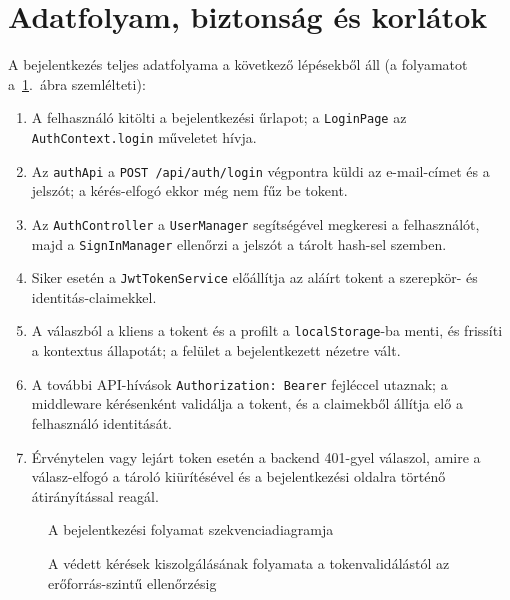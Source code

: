 \section{Adatfolyam, biztonság és korlátok}
\label{sec:users-biztonsag}

A bejelentkezés teljes adatfolyama a következő lépésekből áll (a folyamatot
a~\ref{fig:auth-sequence}.~ábra szemlélteti):

\begin{enumerate}
	\item A felhasználó kitölti a bejelentkezési űrlapot; a \texttt{LoginPage} az
	      \texttt{AuthContext.login} műveletet hívja.
	\item Az \texttt{authApi} a \texttt{POST /api/auth/login} végpontra küldi az e-mail-címet és a
	      jelszót; a kérés-elfogó ekkor még nem fűz be tokent.
	\item Az \texttt{AuthController} a \texttt{UserManager} segítségével megkeresi a felhasználót,
	      majd a \texttt{SignInManager} ellenőrzi a jelszót a tárolt hash-sel szemben.
	\item Siker esetén a \texttt{JwtTokenService} előállítja az aláírt tokent a szerepkör- és
	      identitás-claimekkel.
	\item A válaszból a kliens a tokent és a profilt a \texttt{localStorage}-ba menti, és frissíti a
	      kontextus állapotát; a felület a bejelentkezett nézetre vált.
	\item A további API-hívások \texttt{Authorization: Bearer} fejléccel utaznak; a middleware
	      kérésenként validálja a tokent, és a claimekből állítja elő a felhasználó identitását.
	\item Érvénytelen vagy lejárt token esetén a backend 401-gyel válaszol, amire a válasz-elfogó a
	      tároló kiürítésével és a bejelentkezési oldalra történő átirányítással reagál.
\end{enumerate}

\begin{figure}[htbp]
	\centering
	\caption{A bejelentkezési folyamat szekvenciadiagramja}
	\label{fig:auth-sequence}
\end{figure}

\begin{figure}[htbp]
	\centering
	\caption{A védett kérések kiszolgálásának folyamata a tokenvalidálástól az erőforrás-szintű ellenőrzésig}
	\label{fig:auth-flow}
\end{figure}

